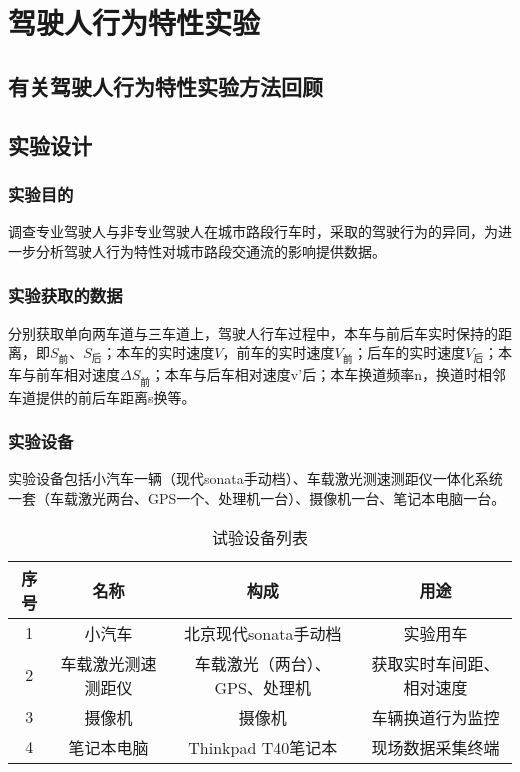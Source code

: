 \chapter{驾驶人行为特性实验}






\section{有关驾驶人行为特性实验方法回顾}


\section{实验设计}
\subsection{实验目的}

调查专业驾驶人与非专业驾驶人在城市路段行车时，采取的驾驶行为的异同，为进一步分析驾驶人行为特性对城市路段交通流的影响提供数据。

\subsection{实验获取的数据}
分别获取单向两车道与三车道上，驾驶人行车过程中，本车与前后车实时保持的距离，即$S_{\text{前}}$、$S_{\text{后}}$；本车的实时速度$V$，前车的实时速度$V_{\text{前}}$；后车的实时速度$V_{\text{后}}$；本车与前车相对速度${\Delta}S_{\text{前}}$；本车与后车相对速度v’后；本车换道频率n，换道时相邻车道提供的前后车距离s换等。


\subsection{实验设备}
实验设备包括小汽车一辆（现代sonata手动档）、车载激光测速测距仪一体化系统一套（车载激光两台、GPS一个、处理机一台）、摄像机一台、笔记本电脑一台。
\begin{table}[htbp]
 \centering
 \caption{试验设备列表}
 \begin{tabular}{cccc}
   \addlinespace
    \toprule
    序号 & 名称  & 构成 & 用途 \\
    \midrule
	1 & 小汽车 & 北京现代sonata手动档 & 实验用车 \\
	2 & 车载激光测速测距仪 & 车载激光（两台）、GPS、处理机 & 获取实时车间距、相对速度 \\
	3 & 摄像机 & 摄像机 & 车辆换道行为监控 \\
	4 & 笔记本电脑 & Thinkpad T40笔记本 & 现场数据采集终端 \\
    \bottomrule
    \end{tabular}
  \label{tab:addlabel}
\end{table}

